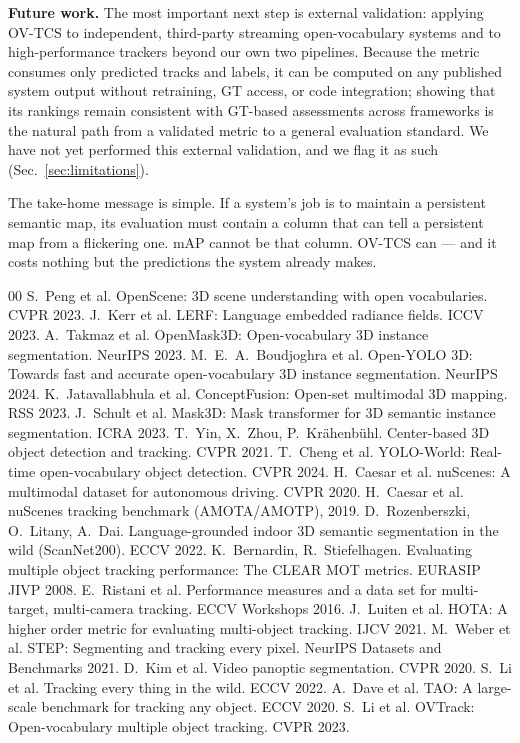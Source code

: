 \documentclass[10pt,twocolumn,letterpaper]{article}
\begin{document}
\noindent\textbf{Future work.} The most important next step is external
validation: applying OV-TCS to independent, third-party streaming
open-vocabulary systems and to high-performance trackers beyond our own two
pipelines. Because the metric consumes only predicted tracks and labels, it
can be computed on any published system output without retraining, GT access,
or code integration; showing that its rankings remain consistent with
GT-based assessments across frameworks is the natural path from a validated
metric to a general evaluation standard. We have not yet performed this
external validation, and we flag it as such (Sec.~\ref{sec:limitations}).

The take-home message is simple. If a system's job is to maintain a
persistent semantic map, its evaluation must contain a column that can tell
a persistent map from a flickering one. mAP cannot be that column. OV-TCS
can --- and it costs nothing but the predictions the system already makes.

{\small
\begin{thebibliography}{00}
 S.~Peng et al. OpenScene: 3D scene understanding with
open vocabularies. CVPR 2023.
 J.~Kerr et al. LERF: Language embedded radiance fields.
ICCV 2023.
 A.~Takmaz et al. OpenMask3D: Open-vocabulary 3D
instance segmentation. NeurIPS 2023.
 M.~E.~A.~Boudjoghra et al. Open-YOLO 3D: Towards fast
and accurate open-vocabulary 3D instance segmentation. NeurIPS 2024.
 K.~Jatavallabhula et al. ConceptFusion:
Open-set multimodal 3D mapping. RSS 2023.
 J.~Schult et al. Mask3D: Mask transformer for 3D semantic
instance segmentation. ICRA 2023.
 T.~Yin, X.~Zhou, P.~Kr\"ahenb\"uhl. Center-based 3D
object detection and tracking. CVPR 2021.
 T.~Cheng et al. YOLO-World: Real-time open-vocabulary
object detection. CVPR 2024.
 H.~Caesar et al. nuScenes: A multimodal dataset for
autonomous driving. CVPR 2020.
 H.~Caesar et al. nuScenes tracking benchmark
(AMOTA/AMOTP), 2019.
 D.~Rozenberszki, O.~Litany, A.~Dai. Language-grounded
indoor 3D semantic segmentation in the wild (ScanNet200). ECCV 2022.
 K.~Bernardin, R.~Stiefelhagen. Evaluating multiple object
tracking performance: The CLEAR MOT metrics. EURASIP JIVP 2008.
 E.~Ristani et al. Performance measures and a data set for
multi-target, multi-camera tracking. ECCV Workshops 2016.
 J.~Luiten et al. HOTA: A higher order metric for evaluating
multi-object tracking. IJCV 2021.
 M.~Weber et al. STEP: Segmenting and tracking every pixel.
NeurIPS Datasets and Benchmarks 2021.
 D.~Kim et al. Video panoptic segmentation. CVPR 2020.
 S.~Li et al. Tracking every thing in the wild. ECCV 2022.
 A.~Dave et al. TAO: A large-scale benchmark for tracking any
object. ECCV 2020.
 S.~Li et al. OVTrack: Open-vocabulary multiple object
tracking. CVPR 2023.
\end{thebibliography}
}
\end{document}
